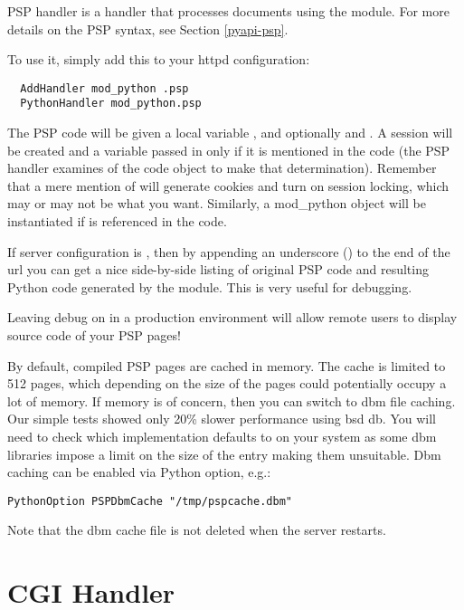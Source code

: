 PSP handler is a handler that processes documents using the
 module. For more details on the PSP syntax, see
Section \ref{pyapi-psp}.

To use it, simply add this to your httpd configuration: 

\begin{verbatim}
  AddHandler mod_python .psp
  PythonHandler mod_python.psp
\end{verbatim}

The PSP code will be given a local variable , and optionally
 and . A session will be created and a
 variable passed in only if it is mentioned in the code
(the PSP handler examines  of the code object to make
that determination). Remember that a mere mention of 
will generate cookies and turn on session locking, which may or may
not be what you want. Similarly, a mod_python 
object will be instantiated if  is referenced in the code.

If  server configuration is , then by
appending an underscore (\samp{_}) to the end of the url you can get a
nice side-by-side listing of original PSP code and resulting Python
code generated by the  module. This is very useful for
debugging.

\begin{notice}
Leaving debug on in a production environment will allow remote users
to display source code of your PSP pages!
\end{notice}

By default, compiled PSP pages are cached in memory. The cache is
limited to 512 pages, which depending on the size of the pages could
potentially occupy a lot of memory. If memory is of concern, then you
can switch to dbm file caching. Our simple tests showed only 20\%
slower performance using bsd db. You will need to check which
implementation  defaults to on your system as some dbm
libraries impose a limit on the size of the entry making them
unsuitable. Dbm caching can be enabled via  Python
option, e.g.:

\begin{verbatim}
PythonOption PSPDbmCache "/tmp/pspcache.dbm"
\end{verbatim}
Note that the dbm cache file is not deleted when the server restarts.

\section{CGI Handler\label{hand-cgi}}


